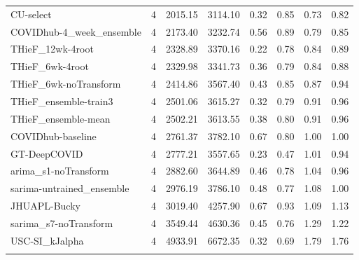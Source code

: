 \documentclass[12pt]{article}
\begin{document}
\begin{longtable}{lrrrrrrr}
  CU-select & 4 & 2015.15 & 3114.10 & 0.32 & 0.85 & 0.73 & 0.82 \\ 
  COVIDhub-4\_week\_ensemble & 4 & 2173.40 & 3232.74 & 0.56 & 0.89 & 0.79 & 0.85 \\ 
  THieF\_12wk-4root & 4 & 2328.89 & 3370.16 & 0.22 & 0.78 & 0.84 & 0.89 \\ 
  THieF\_6wk-4root & 4 & 2329.98 & 3341.73 & 0.36 & 0.79 & 0.84 & 0.88 \\ 
  THieF\_6wk-noTransform & 4 & 2414.86 & 3567.40 & 0.43 & 0.85 & 0.87 & 0.94 \\ 
  THieF\_ensemble-train3 & 4 & 2501.06 & 3615.27 & 0.32 & 0.79 & 0.91 & 0.96 \\ 
  THieF\_ensemble-mean & 4 & 2502.21 & 3613.55 & 0.38 & 0.80 & 0.91 & 0.96 \\ 
  COVIDhub-baseline & 4 & 2761.37 & 3782.10 & 0.67 & 0.80 & 1.00 & 1.00 \\ 
  GT-DeepCOVID & 4 & 2777.21 & 3557.65 & 0.23 & 0.47 & 1.01 & 0.94 \\ 
  arima\_s1-noTransform & 4 & 2882.60 & 3644.89 & 0.46 & 0.78 & 1.04 & 0.96 \\ 
  sarima-untrained\_ensemble & 4 & 2976.19 & 3786.10 & 0.48 & 0.77 & 1.08 & 1.00 \\ 
  JHUAPL-Bucky & 4 & 3019.40 & 4257.90 & 0.67 & 0.93 & 1.09 & 1.13 \\ 
  sarima\_s7-noTransform & 4 & 3549.44 & 4630.36 & 0.45 & 0.76 & 1.29 & 1.22 \\ 
  USC-SI\_kJalpha & 4 & 4933.91 & 6672.35 & 0.32 & 0.69 & 1.79 & 1.76 \\ 
   \hline
\hline
\label{tab:table_horizon_us}
\end{longtable}
\endgroup

\newpage
\end{document}
